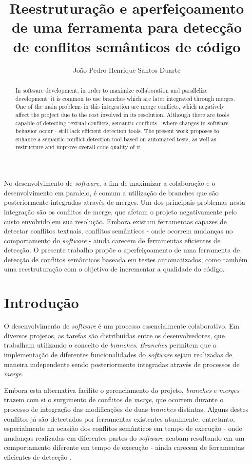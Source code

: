 \documentclass[12pt]{article}
\title{Reestruturação e aperfeiçoamento de uma ferramenta para detecção de conflitos semânticos de código}
\author{João Pedro Henrique Santos Duarte\inst{1}}
\begin{document}
\maketitle

\begin{abstract}
In software development, in order to maximize collaboration and parallelize development, it is common to use branches which are later integrated through merges. One of the main problems in this integration are merge conflicts, which negatively affect the project due to the cost involved in its resolution. Although there are tools capable of detecting textual conflicts, semantic conflicts - where changes in software behavior occur - still lack efficient detection tools. The present work proposes to enhance a semantic conflict detection tool based on automated tests, as well as restructure and improve overall code quality of it.
\end{abstract}
     
\begin{resumo} 
No desenvolvimento de \textit{software}, a fim de maximizar a colaboração e o desenvolvimento em paralelo, é comum a utilização de branches que são posteriormente integradas através de merges. Um dos principais problemas nesta integração são os conflitos de merge, que afetam o projeto negativamente pelo custo envolvido em sua resolução. Embora existam ferramentas capazes de detectar conflitos textuais, conflitos semânticos - onde ocorrem mudanças no comportamento do \textit{software} - ainda carecem de ferramentas eficientes de detecção. O presente trabalho propõe o aperfeiçoamento de uma ferramenta de detecção de conflitos semânticos baseada em testes automatizados, como também uma reestruturação com o objetivo de incrementar a qualidade do código.
\end{resumo}

\section{Introdução}
O desenvolvimento de \textit{software} é um processo essencialmente colaborativo. Em diversos projetos, as tarefas são distribuídas entre os desenvolvedores, que trabalham utilizando o conceito de \textit{branches}. \textit{Branches} permitem que a implementação de diferentes funcionalidades do \textit{software} sejam realizadas de maneira independente sendo posteriormente integradas através de processos de \textit{merge}.

Embora esta alternativa facilite o gerenciamento do projeto, \textit{branches} e \textit{merges} trazem com si o surgimento de conflitos de \textit{merge}, que ocorrem durante o processo de integração das modificações de duas \textit{branches} distintas. Alguns destes conflitos já são detectados por ferramentas existentes atualmente, entretanto, especialmente na ocasião dos conflitos semânticos em tempo de execução - onde mudanças realizadas em diferentes partes do \textit{software} acabam resultando em um comportamento diferente em tempo de execução - ainda carecem de ferramentas eficientes de detecção \cite{cavalcanti:icse}.
\end{document}
